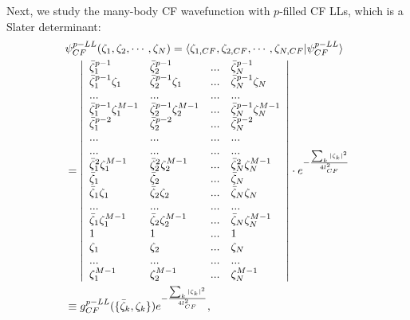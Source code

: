 Next, we study the many-body CF wavefunction with $p$-filled CF LLs, which is a Slater determinant:
\begin{align}
     & \psi^{p-LL}_{CF}(\zeta_1,\zeta_2,\cdots,\zeta_N)=\langle  \zeta_{1,CF},\zeta_{2,CF},\cdots,\zeta_{N,CF} |\psi^{p-LL}_{CF}\rangle\notag \\
     & =\left|\begin{array}{llll} \bar\zeta_1^{p-1}       & \bar\zeta_2^{p-1}              & ... & \bar\zeta_N^{p-1}              \\
             \bar\zeta_1^{p-1}\zeta_1       & \bar\zeta_2^{p-1}\zeta_1       & ... & \bar\zeta_N^{p-1}\zeta_N       \\
             ...                            & ...                            & ... & ...                            \\
             \bar\zeta_1^{p-1}\zeta_1^{M-1} & \bar\zeta_2^{p-1}\zeta_2^{M-1} & ... & \bar\zeta_N^{p-1}\zeta_N^{M-1} \\
             \bar\zeta_1^{p-2}              & \bar\zeta_2^{p-2}              & ... & \bar\zeta_N^{p-2}              \\
             ...                            & ...                            & ... & ...                            \\
             ...                            & ...                            & ... & ...                            \\
             \bar\zeta_1^{2}\zeta_1^{M-1}   & \bar\zeta_2^{2}\zeta_2^{M-1}   & ... & \bar\zeta_N^{2}\zeta_N^{M-1}   \\
             \bar\zeta_1                    & \bar\zeta_2                    & ... & \bar\zeta_N                    \\
             \bar\zeta_1 \zeta_1            & \bar\zeta_2 \zeta_2            & ... & \bar\zeta_N \zeta_N            \\
             ...                            & ...                            & ... & ...                            \\
             \bar\zeta_1 \zeta_1^{M-1}      & \bar\zeta_2 \zeta_2^{M-1}      & ... & \bar\zeta_N \zeta_N^{M-1}      \\
             1                              & 1                              & ... & 1                              \\
             \zeta_1                        & \zeta_2                        & ... & \zeta_N                        \\
             ...                            & ...                            & ... & ...                            \\
             \zeta_1^{M-1}                  & \zeta_2^{M-1}                  & ... & \zeta_N^{M-1}                  \\
              \end{array} \right|\cdot e^{-\frac{\sum_k|\zeta_k|^2}{4l_{CF}^2}}\notag             \\
     & \equiv g^{p-LL}_{CF}(\{\bar\zeta_k,\zeta_k\})e^{-\frac{\sum_k|\zeta_k|^2}{4l_{CF}^2}} ,\label{eq:p_2_slater}
\end{align}
